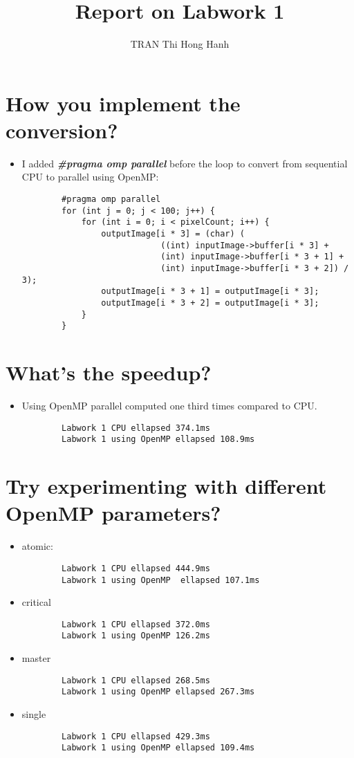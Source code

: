 \documentclass{article}
\title{Report on Labwork 1}
\author{TRAN Thi Hong Hanh}
\begin{document}
\maketitle
\section{How you implement the conversion?}
    \begin{itemize}
        \item I added \textbf{\textit{\#pragma omp parallel}} before the loop to convert from sequential CPU to parallel using OpenMP:
    \begin{verbatim}
        #pragma omp parallel 
        for (int j = 0; j < 100; j++) {     
            for (int i = 0; i < pixelCount; i++) {
                outputImage[i * 3] = (char) (
                            ((int) inputImage->buffer[i * 3] +
                            (int) inputImage->buffer[i * 3 + 1] +
                            (int) inputImage->buffer[i * 3 + 2]) / 3);
                outputImage[i * 3 + 1] = outputImage[i * 3];
                outputImage[i * 3 + 2] = outputImage[i * 3];
            }
        }
    \end{verbatim}
    \end{itemize}
\section{What’s the speedup?}
    \begin{itemize}
        \item Using OpenMP parallel computed one third times compared to CPU.
        \begin{verbatim}
        Labwork 1 CPU ellapsed 374.1ms
        Labwork 1 using OpenMP ellapsed 108.9ms
        \end{verbatim}
    \end{itemize}
\section{Try experimenting with different OpenMP parameters?}
    \begin{itemize}
        \item atomic:
        \begin{verbatim}
        Labwork 1 CPU ellapsed 444.9ms
        Labwork 1 using OpenMP  ellapsed 107.1ms
        \end{verbatim}
        \item critical
        \begin{verbatim}
        Labwork 1 CPU ellapsed 372.0ms
        Labwork 1 using OpenMP 126.2ms
        \end{verbatim}
        \item master
        \begin{verbatim}
        Labwork 1 CPU ellapsed 268.5ms
        Labwork 1 using OpenMP ellapsed 267.3ms    
        \end{verbatim}
        \item single
        \begin{verbatim}
        Labwork 1 CPU ellapsed 429.3ms
        Labwork 1 using OpenMP ellapsed 109.4ms
        \end{verbatim}
    \end{itemize}
\end{document}

